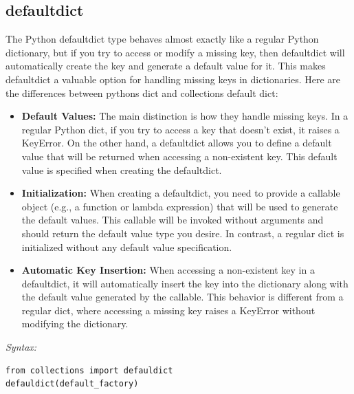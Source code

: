 \documentclass{report}
\begin{document}
    \subsection{defaultdict}
    \bigbreak \noindent
    The Python defaultdict type behaves almost exactly like a regular Python dictionary, but if you try to access or modify a missing key, then defaultdict will automatically create the key and generate a default value for it. This makes defaultdict a valuable option for handling missing keys in dictionaries.
    \bigbreak \noindent 
    Here are the differences between pythons dict and collections default dict:
    \begin{itemize}
        \item \textbf{Default Values:} The main distinction is how they handle missing keys. In a regular Python dict, if you try to access a key that doesn't exist, it raises a KeyError. On the other hand, a defaultdict allows you to define a default value that will be returned when accessing a non-existent key. This default value is specified when creating the defaultdict.
        \item \textbf{Initialization:} When creating a defaultdict, you need to provide a callable object (e.g., a function or lambda expression) that will be used to generate the default values. This callable will be invoked without arguments and should return the default value type you desire. In contrast, a regular dict is initialized without any default value specification.
        \item \textbf{Automatic Key Insertion:} When accessing a non-existent key in a defaultdict, it will automatically insert the key into the dictionary along with the default value generated by the callable. This behavior is different from a regular dict, where accessing a missing key raises a KeyError without modifying the dictionary.
    \end{itemize}
    \bigbreak \noindent 
    \textit{Syntax:}
    \begin{verbatim}
from collections import defauldict
defauldict(default_factory)
    \end{verbatim}
\end{document}

